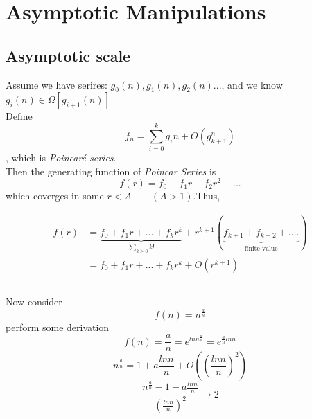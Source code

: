 \documentclass[11pt]{article}
\begin{document}
\section{Asymptotic Manipulations}

\subsection{Asymptotic scale}

Assume we have serires: $g_0(n), g_1(n), g_2(n) ...$, and we know $g_i(n) \in \Omega [g_{i+1}(n)]$ 
\\
Define \\
\[f_n = \sum_{i=0}^k g_i{n} + O(g_{k+1}^n)\]
, which is \textit{Poincaré series}. \\
Then the generating function of \emph{Poincar Series} is \\
\[f(r)=f_0+f_1r+f_2r^2+...\]
 which coverges in some $ r<A\qquad (A>1)$.Thus,

\begin{align*}
f(r)  &= \underbrace{f_0 + f_1r + ... +f_kr^k }_{\sum_{k\geq0} k!}+ r^{k+1}(\underbrace{f_{k+1}+ f_{k+2} + ....}_{\mbox{finite value}}) \\
      &= f_0 + f_1r + ... + f_kr^k + O(r^{k+1})
\end{align*}

\subsection{}
Now consider \\
\[ f(n) = n^{\frac{a}{n}} \]
perform some derivation \\
\[
f(n)=\frac{a}{n}=e^{lnn^{\frac{a}{n}}}=e^{\frac{a}{n}lnn}
\]
\[
n^{\frac{a}{n}}=1+a\frac{lnn}{n}+O\left((\frac{lnn}{n})^2\right)
\]
\[
\frac{n^{\frac{a}{n}}-1-a\frac{lnn}{n}}{(\frac{lnn}{n})^2}\rightarrow 2
\]
\end{document}
